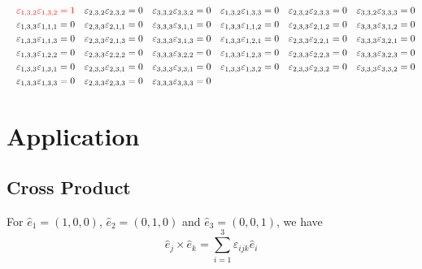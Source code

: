\documentclass[12pt]{article}
\begin{document}
\begin{equation}
\begin{aligned}
&&{\color{red}\varepsilon_{1,3,2}\varepsilon_{1,3,2}=1}
&&\varepsilon_{2,3,2}\varepsilon_{2,3,2}=0&&\varepsilon_{3,3,2}\varepsilon_{3,3,2}=0&&\varepsilon_{1,3,2}\varepsilon_{1,3,3}=0&&\varepsilon_{2,3,2}\varepsilon_{2,3,3}=0&&\varepsilon_{3,3,2}\varepsilon_{3,3,3}=0\\
&&\varepsilon_{1,3,3}\varepsilon_{1,1,1}=0&&\varepsilon_{2,3,3}\varepsilon_{2,1,1}=0&&\varepsilon_{3,3,3}\varepsilon_{3,1,1}=0&&\varepsilon_{1,3,3}\varepsilon_{1,1,2}=0&&\varepsilon_{2,3,3}\varepsilon_{2,1,2}=0&&\varepsilon_{3,3,3}\varepsilon_{3,1,2}=0\\
&&\varepsilon_{1,3,3}\varepsilon_{1,1,3}=0&&\varepsilon_{2,3,3}\varepsilon_{2,1,3}=0&&\varepsilon_{3,3,3}\varepsilon_{3,1,3}=0&&\varepsilon_{1,3,3}\varepsilon_{1,2,1}=0&&\varepsilon_{2,3,3}\varepsilon_{2,2,1}=0&&\varepsilon_{3,3,3}\varepsilon_{3,2,1}=0\\
&&\varepsilon_{1,3,3}\varepsilon_{1,2,2}=0&&\varepsilon_{2,3,3}\varepsilon_{2,2,2}=0&&\varepsilon_{3,3,3}\varepsilon_{3,2,2}=0&&\varepsilon_{1,3,3}\varepsilon_{1,2,3}=0&&\varepsilon_{2,3,3}\varepsilon_{2,2,3}=0&&\varepsilon_{3,3,3}\varepsilon_{3,2,3}=0\\
&&\varepsilon_{1,3,3}\varepsilon_{1,3,1}=0&&\varepsilon_{2,3,3}\varepsilon_{2,3,1}=0&&\varepsilon_{3,3,3}\varepsilon_{3,3,1}=0&&\varepsilon_{1,3,3}\varepsilon_{1,3,2}=0&&\varepsilon_{2,3,3}\varepsilon_{2,3,2}=0&&\varepsilon_{3,3,3}\varepsilon_{3,3,2}=0\\
&&\varepsilon_{1,3,3}\varepsilon_{1,3,3}=0&&\varepsilon_{2,3,3}\varepsilon_{2,3,3}=0&&\varepsilon_{3,3,3}\varepsilon_{3,3,3}=0
\end{aligned}
\end{equation}
\newpage

\section{Application}
\subsection{Cross Product}
For $\hat{e}_1=(1,0,0)$, $\hat{e}_2=(0,1,0)$ and $\hat{e}_3=(0,0,1)$, we have
\begin{equation}
\hat{e}_j\times\hat{e}_k=\sum_{i=1}^3\varepsilon_{ijk}\hat{e}_i
\end{equation}
\end{document}
